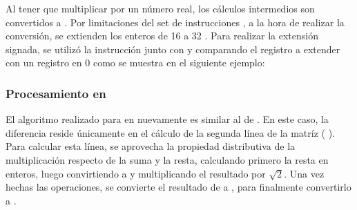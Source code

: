 Al tener que multiplicar por un número real, los cálculos intermedios son convertidos a . Por limitaciones del set de instrucciones
, a la hora de realizar la conversión, se extienden los enteros de 16  a 32 . Para realizar la extensión signada,
se utilizó la instrucción  junto con  y  comparando el registro a extender con un registro en 0 como se 
muestra en el siguiente ejemplo:
\begin{center}
\end{center}

\subsubsection{Procesamiento en }
	El algoritmo realizado para  en  nuevamente es similar al de . En este caso, la diferencia reside únicamente
en el cálculo de la segunda línea de la matríz (
). Para calcular esta línea, se aprovecha la propiedad distributiva de la multiplicación respecto de la suma y la resta, calculando primero la resta 
en enteros, luego convirtiendo a  y multiplicando el resultado por $\sqrt{2}$. Una vez hechas las operaciones, se convierte el resultado 
de  a , para finalmente convertirlo a .

